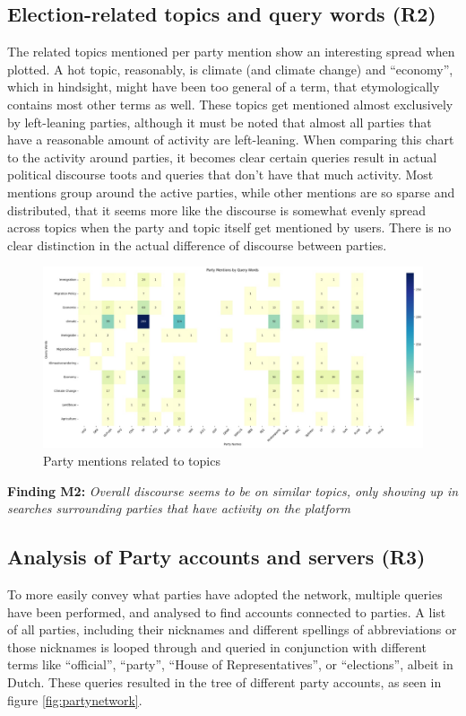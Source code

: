 \subsection{Election-related topics and query words (R2)}
The related topics mentioned per party mention show an interesting spread when plotted.
A hot topic, reasonably, is climate (and climate change) and “economy”, which in hindsight, might have been too general of a term, that etymologically contains most other terms as well.
These topics get mentioned almost exclusively by left-leaning parties, although it must be noted that almost all parties that have a reasonable amount of activity are left-leaning.
When comparing this chart to the activity around parties, it becomes clear certain queries result in actual political discourse toots and queries that don't have that much activity.
Most mentions group around the active parties, while other mentions are so sparse and distributed, that it seems more like the discourse is somewhat evenly spread across topics when the party and topic itself get mentioned by users.
There is no clear distinction in the actual difference of discourse between parties.
\begin{figure}[ht]
  \centering
  \includegraphics[width=\linewidth]{media/party-mentions-topics.jpeg}
  \caption{Party mentions related to topics}
  \label{fig:topic}
\end{figure}


\textbf{Finding M2:} \textit{Overall discourse seems to be on similar topics, only showing up in searches surrounding parties that have activity on the platform}

\subsection{Analysis of Party accounts and servers (R3)}
To more easily convey what parties have adopted the network, multiple queries have been performed, and analysed to find accounts connected to parties.
A list of all parties, including their nicknames and different spellings of abbreviations or those nicknames is looped through and queried in conjunction with different terms like “official”, “party”, “House of Representatives”, or “elections”, albeit in Dutch.
These queries resulted in the tree of different party accounts, as seen in figure \ref{fig:partynetwork}.

